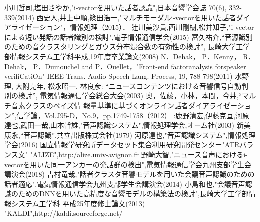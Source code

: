 \begin{thebibliography}{99}     %
小川哲司,塩田さやか,"i-vectorを用いた話者認識",日本音響学会誌 70(6), 332-339(2014)
西史人,井上中順,篠田浩一,"マルチモーダルi-vectorを用いた話者ダイアライゼーション"，情報処理（2015）．
辻川美沙貴,西川剛樹,松井知子,"i-vectorによる短い発話の話者識別の検討",電子情報通信学会(2015)
冨久祐介,“音源識別のための音クラスタリングとガウス分布混合数の有効性の検討”,
長崎大学工学部情報システム工学科平成,19年度卒業論文(2008)
N．Dehak， P．Kenny， R．Dehak， P．Dumouchel and P．Ouellet，"Front-end factoranalysis forspeaker verifiCatiOn" IEEE Trans. Audio Speech Lang. Process, 19, 788-798(2011)
水野理, 大附克年, 松永昭一, 林良彦: “ニュースコンテンツにおける音響信号自動判
別の検討”, 電気情報通信学会総合大会(2003)
奥，佐藤，小林，本間，今井,“マルチ音素クラスのベイズ情
報量基準に基づくオンライン話者ダイアライゼーション”,信学論，Vol.J95-D，No.9，pp.1749-1758（2012）
:鹿野清宏,伊藤克亘,河原達也,武田一哉,山本幹雄,"音声認識システム",情報処理学会,オーム社(2003)
新美康永,“音声認識”,共立出版株式会社(1979)
河原達也,"音声認識システム",情報処理学会(2016)
国立情報学研究所データセット集合利用研究開発センター"ATRバランス文"
"ALIZE",http:/alize.univ-avignon.fr
野崎大智,"ニュース音声におけるi-vectorを用いた同一アンカーの発話群の検出",電気情報通信学会九州支部学生会講演会(2018)
吉村竜哉,"話者クラスタ音響モデルを用いた会議音声認識のための話者適応",電気情報通信学会九州支部学生会講演会(2014)
小島和也,"会議音声認識のためのDNNを用いた高精度な音響モデルの構築法の検討",長崎大学工学部情報システム工学科 平成25年度修士論文(2013)
"KALDI",http://kaldi.sourceforge.net/
\end{thebibliography}
